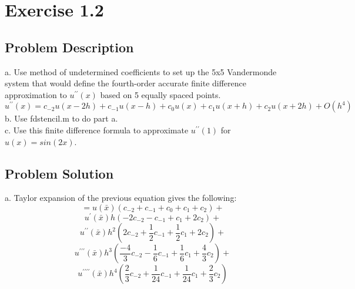 \documentclass[titlepage]{article}
\begin{document}
\section{Exercise 1.2}
\subsection{Problem Description}
a. Use method of undetermined coefficients to set up the 5x5 Vandermonde system that would define the fourth-order accurate finite difference approximation to $u^{\prime \prime}(x)$ based on 5 equally spaced points.
\begin{equation*}
u^{\prime \prime}(x) = c_{-2} u(x-2h) + c_{-1} u(x-h) + c_0 u(x) + c_1 u(x+h) + c_2 u(x+2h) + O(h^4)
\end{equation*}
b. Use fdstencil.m to do part a. \\
c. Use this finite difference formula to approximate $u^{\prime \prime}(1)$ for $u(x) = sin(2x)$.
\subsection{Problem Solution}
a. Taylor expansion of the previous equation gives the following:
\begin{equation*}
=u(\bar{x})(c_{-2} + c_{-1} + c_0 + c_1 + c_2) +
\end{equation*}
\begin{equation*}
u^{\prime}(\bar{x})h(-2c_{-2} -c_{-1} +c_1 +2c_2) +
\end{equation*}
\begin{equation*}
u^{\prime \prime}(\bar{x})h^2(2c_{-2} + \frac{1}{2}c_{-1} +\frac{1}{2}c_1 +2c_2) +
\end{equation*}
\begin{equation*}
u^{\prime \prime \prime}(\bar{x})h^3(\frac{-4}{3}c_{-2} - \frac{1}{6}c_{-1} +\frac{1}{6}c_1 + \frac{4}{3}c_2) +
\end{equation*}
\begin{equation*}
u^{\prime \prime \prime \prime}(\bar{x})h^4(\frac{2}{3}c_{-2} +\frac{1}{24}c_{-1} +\frac{1}{24}c_1 +\frac{2}{3}c_2)
\end{equation*}
\end{document}
